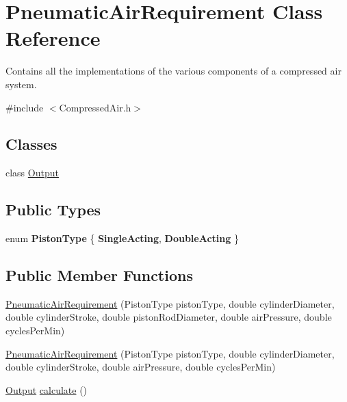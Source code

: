 \hypertarget{class_pneumatic_air_requirement}{}\section{Pneumatic\+Air\+Requirement Class Reference}
\label{class_pneumatic_air_requirement}


Contains all the implementations of the various components of a compressed air system.  




{\ttfamily \#include $<$Compressed\+Air.\+h$>$}

\subsection*{Classes}
\begin{DoxyCompactItemize}
\item 
class \hyperlink{class_pneumatic_air_requirement_1_1_output}{Output}
\end{DoxyCompactItemize}
\subsection*{Public Types}
\begin{DoxyCompactItemize}
\item 
\mbox{\label{class_pneumatic_air_requirement_aa43374a59756771200d03c6e5aeffe1c}} 
enum {\bfseries Piston\+Type} \{ {\bfseries Single\+Acting}, 
{\bfseries Double\+Acting}
 \}
\end{DoxyCompactItemize}
\subsection*{Public Member Functions}
\begin{DoxyCompactItemize}
\item 
\hyperlink{class_pneumatic_air_requirement_a1255612b8467e69471c097c94eabcf69}{Pneumatic\+Air\+Requirement} (Piston\+Type piston\+Type, double cylinder\+Diameter, double cylinder\+Stroke, double piston\+Rod\+Diameter, double air\+Pressure, double cycles\+Per\+Min)
\item 
\hyperlink{class_pneumatic_air_requirement_a47910bc2b0f76b2c3733b0ba570a38cc}{Pneumatic\+Air\+Requirement} (Piston\+Type piston\+Type, double cylinder\+Diameter, double cylinder\+Stroke, double air\+Pressure, double cycles\+Per\+Min)
\item 
\hyperlink{class_pneumatic_air_requirement_1_1_output}{Output} \hyperlink{class_pneumatic_air_requirement_a53ea28fb64140f7bec6eedd433ac1405}{calculate} ()
\end{DoxyCompactItemize}


